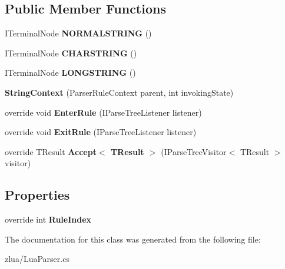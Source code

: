 \subsection*{Public Member Functions}
\begin{DoxyCompactItemize}
\item 
\mbox{\label{classzlua_1_1_lua_parser_1_1_string_context_aa29ef59cb5ae847bc66f039edd31bc28}} 
I\+Terminal\+Node {\bfseries N\+O\+R\+M\+A\+L\+S\+T\+R\+I\+NG} ()
\item 
\mbox{\label{classzlua_1_1_lua_parser_1_1_string_context_afc8f1f8c0163498ae017042c7266610b}} 
I\+Terminal\+Node {\bfseries C\+H\+A\+R\+S\+T\+R\+I\+NG} ()
\item 
\mbox{\label{classzlua_1_1_lua_parser_1_1_string_context_a78c17f04424f48c5e48c6e84a1e45e49}} 
I\+Terminal\+Node {\bfseries L\+O\+N\+G\+S\+T\+R\+I\+NG} ()
\item 
\mbox{\label{classzlua_1_1_lua_parser_1_1_string_context_a2daf018247920b85cc2b6478a98a7652}} 
{\bfseries String\+Context} (Parser\+Rule\+Context parent, int invoking\+State)
\item 
\mbox{\label{classzlua_1_1_lua_parser_1_1_string_context_a681f60faa0d35c0c0beafd196afea353}} 
override void {\bfseries Enter\+Rule} (I\+Parse\+Tree\+Listener listener)
\item 
\mbox{\label{classzlua_1_1_lua_parser_1_1_string_context_ae832c017645a474eb3e75c9b3aed4f8f}} 
override void {\bfseries Exit\+Rule} (I\+Parse\+Tree\+Listener listener)
\item 
\mbox{\label{classzlua_1_1_lua_parser_1_1_string_context_aba7ec45e0ce8f58db3c7db80edd1fa88}} 
override T\+Result {\bfseries Accept$<$ T\+Result $>$} (I\+Parse\+Tree\+Visitor$<$ T\+Result $>$ visitor)
\end{DoxyCompactItemize}
\subsection*{Properties}
\begin{DoxyCompactItemize}
\item 
\mbox{\label{classzlua_1_1_lua_parser_1_1_string_context_a7c3d7306130ef0e374b1e868df9f92d1}} 
override int {\bfseries Rule\+Index}
\end{DoxyCompactItemize}


The documentation for this class was generated from the following file\+:\begin{DoxyCompactItemize}
\item 
zlua/Lua\+Parser.\+cs\end{DoxyCompactItemize}
